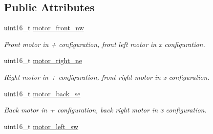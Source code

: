 \subsection*{Public Attributes}
\begin{DoxyCompactItemize}
\item 
\hypertarget{struct____mavlink__set__quad__motors__setpoint__t_abc4491406798b03d54eec9ef0f4bd5d1}{uint16\+\_\+t \hyperlink{struct____mavlink__set__quad__motors__setpoint__t_abc4491406798b03d54eec9ef0f4bd5d1}{motor\+\_\+front\+\_\+nw}}\label{struct____mavlink__set__quad__motors__setpoint__t_abc4491406798b03d54eec9ef0f4bd5d1}

\begin{DoxyCompactList}\small\item\em Front motor in + configuration, front left motor in x configuration. \end{DoxyCompactList}\item 
\hypertarget{struct____mavlink__set__quad__motors__setpoint__t_add9189ea075924d28bb0a4c04c04fcee}{uint16\+\_\+t \hyperlink{struct____mavlink__set__quad__motors__setpoint__t_add9189ea075924d28bb0a4c04c04fcee}{motor\+\_\+right\+\_\+ne}}\label{struct____mavlink__set__quad__motors__setpoint__t_add9189ea075924d28bb0a4c04c04fcee}

\begin{DoxyCompactList}\small\item\em Right motor in + configuration, front right motor in x configuration. \end{DoxyCompactList}\item 
\hypertarget{struct____mavlink__set__quad__motors__setpoint__t_af5975aa67474104310c00bfba17f9dc1}{uint16\+\_\+t \hyperlink{struct____mavlink__set__quad__motors__setpoint__t_af5975aa67474104310c00bfba17f9dc1}{motor\+\_\+back\+\_\+se}}\label{struct____mavlink__set__quad__motors__setpoint__t_af5975aa67474104310c00bfba17f9dc1}

\begin{DoxyCompactList}\small\item\em Back motor in + configuration, back right motor in x configuration. \end{DoxyCompactList}\item 
\hypertarget{struct____mavlink__set__quad__motors__setpoint__t_adf7327b8cd6bb3e73e6aaeaea75d639c}{uint16\+\_\+t \hyperlink{struct____mavlink__set__quad__motors__setpoint__t_adf7327b8cd6bb3e73e6aaeaea75d639c}{motor\+\_\+left\+\_\+sw}}\label{struct____mavlink__set__quad__motors__setpoint__t_adf7327b8cd6bb3e73e6aaeaea75d639c}


\end{DoxyCompactItemize}
